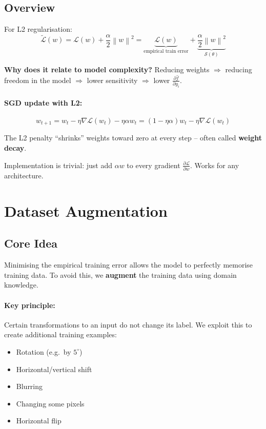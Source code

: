 \documentclass[12pt,a4paper]{article}
\newcommand{\norm}[1]{\left\|#1\right\|}
\newcommand{\grad}{\nabla}
\newcommand{\Loss}{\mathcal{L}}
\newcommand{\Reg}{\mathcal{S}}
\begin{document}
\subsection{Overview}

For L2 regularisation:
\[
  \tilde{\Loss}(w)
  = \Loss(w) + \frac{\alpha}{2}\norm{w}^2
  = \underbrace{\Loss(w)}_{\text{empirical train error}}
  + \underbrace{\frac{\alpha}{2}\norm{w}^2}_{\Reg(\theta)}
\]

\textbf{Why does it relate to model complexity?} Reducing weights $\Rightarrow$ reducing freedom in the model $\Rightarrow$ lower sensitivity $\Rightarrow$ lower $\frac{\partial\hat{f}}{\partial y_i}$.

\paragraph{SGD update with L2:}
\[
  w_{t+1} = w_t - \eta\grad\Loss(w_t) - \eta\alpha w_t
  = (1-\eta\alpha)w_t - \eta\grad\Loss(w_t)
\]

The L2 penalty ``shrinks'' weights toward zero at every step -- often called \textbf{weight decay}.

\begin{notebox}
Implementation is trivial: just add $\alpha w$ to every gradient $\frac{\partial\Loss}{\partial w}$. Works for any architecture.
\end{notebox}

\section{Dataset Augmentation}

\subsection{Core Idea}

Minimising the empirical training error allows the model to perfectly memorise training data. To avoid this, we \textbf{augment} the training data using domain knowledge.

\paragraph{Key principle:} Certain transformations to an input do not change its label. We exploit this to create additional training examples:
\begin{itemize}
  \item Rotation (e.g.\ by $5^\circ$)
  \item Horizontal/vertical shift
  \item Blurring
  \item Changing some pixels
  \item Horizontal flip
\end{itemize}
\end{document}
